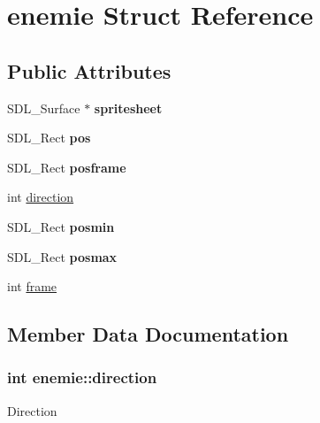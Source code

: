 \hypertarget{structenemie}{}\section{enemie Struct Reference}
\label{structenemie}
\subsection*{Public Attributes}
\begin{DoxyCompactItemize}
\item 
S\+D\+L\+\_\+\+Surface $\ast$ {\bfseries spritesheet}\hypertarget{structenemie_a28437fd9b980920b8067f215e28e42e7}{}\label{structenemie_a28437fd9b980920b8067f215e28e42e7}

\item 
S\+D\+L\+\_\+\+Rect {\bfseries pos}\hypertarget{structenemie_a94d25daa3c8b8a6b83be68c9e44b55d6}{}\label{structenemie_a94d25daa3c8b8a6b83be68c9e44b55d6}

\item 
S\+D\+L\+\_\+\+Rect {\bfseries posframe}\hypertarget{structenemie_aeaf9010d5d783bc115a56647ca4363c3}{}\label{structenemie_aeaf9010d5d783bc115a56647ca4363c3}

\item 
int \hyperlink{structenemie_a5093981b3d727f97eda1312d30b00629}{direction}
\item 
S\+D\+L\+\_\+\+Rect {\bfseries posmin}\hypertarget{structenemie_a2590938ceb8f6987cba4b04058e75075}{}\label{structenemie_a2590938ceb8f6987cba4b04058e75075}

\item 
S\+D\+L\+\_\+\+Rect {\bfseries posmax}\hypertarget{structenemie_a1bcbad7ae57c1b367a6a9db077b18541}{}\label{structenemie_a1bcbad7ae57c1b367a6a9db077b18541}

\item 
int \hyperlink{structenemie_af24b4c2739f5ae830d397c0d13ace987}{frame}
\end{DoxyCompactItemize}


\subsection{Member Data Documentation}
\subsubsection[{\texorpdfstring{direction}{direction}}]{\setlength{\rightskip}{0pt plus 5cm}int enemie\+::direction}\hypertarget{structenemie_a5093981b3d727f97eda1312d30b00629}{}\label{structenemie_a5093981b3d727f97eda1312d30b00629}
Direction 
